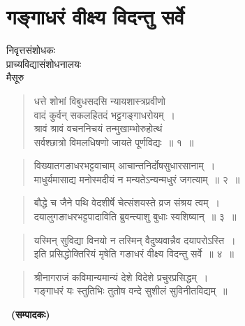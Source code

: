 \chapter{गङ्गाधरं वीक्ष्य विदन्तु सर्वे}

\begin{center}
\smallskip

निवृत्तसंशोधकः\\ 
प्राच्यविद्यासंशोधनालयः\\  
मैसूरु
\addrule
\end{center}

\begin{verse}
धत्ते शोभां विबुधसदसि न्यायशास्त्रप्रवीणो\\
वादं कुर्वन् सकलहितदं भट्टगङ्गाधरोयम्~।\\
श्रावं श्रावं वचननिचयं तन्मुखाम्भोरुहोत्थं\\
सर्वश्छात्रो विमलधिषणो जायते पूर्णविद्यः~॥ १~॥
\end{verse}

\begin{verse}
विख्यातगङाधरभट्टवाचाम् आचान्तनिर्दोषसुधारसानाम्~।\\
माधुर्यमासाद्य मनोस्मदीयं न मन्यतेऽन्यन्मधुरं जगत्याम्~॥ २~॥
\end{verse}

\begin{verse}
बौद्धे च जैने पथि वेदशीर्षे चेत्संशयस्ते व्रज संश्रय त्वम्~।\\
दयालुगङाधरभट्टपादाविति ब्रुवन्त्याशु बुधाः स्वशिष्यान्~॥ ३~॥
\end{verse}

\begin{verse}
यस्मिन् सुविद्या विनयो न तस्मिन् वैदुष्यवान्नैव दयापरोऽस्ति~।\\
इति प्रसिद्धोक्तिरियं मृषेति गङाधरं वीक्ष्य विदन्तु सर्वे~॥ ४~॥
\end{verse}

\begin{verse}
श्रीनागराजं कविमान्यमान्यं देशे विदेशे प्रचुरप्रसिद्धम्~।\\
गङ्गाधरं यः स्तुतिभिः तुतोष वन्दे सुशीलं सुविनीतविद्यम्~॥
\end{verse}

~\hfill\textbf{(सम्पादकः)}

\articleend
